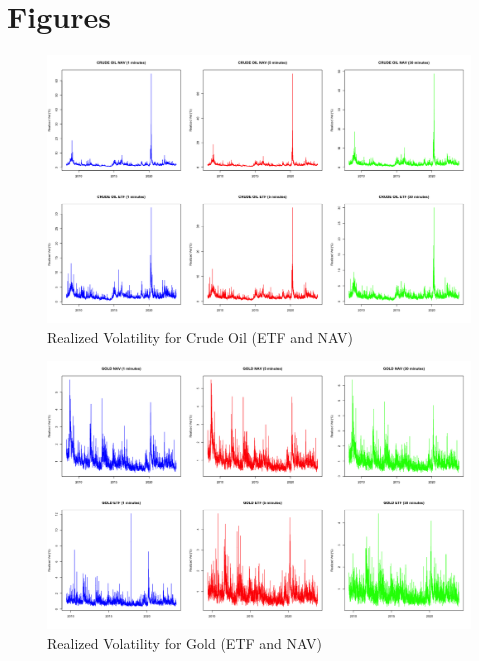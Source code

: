 
\section{Figures}


\begin{landscape}
\begin{figure}[t]
\includegraphics[width=16cm]{USO.png}
\centering
\caption{Realized Volatility for Crude Oil (ETF and NAV)}
\label{fig:rv_uso}
\end{figure}
\end{landscape}

\begin{landscape}
\begin{figure}[t]
\includegraphics[width=16cm]{GLD.png}
\centering
\caption{Realized Volatility for Gold (ETF and NAV)}
\label{fig:rv_gld}
\end{figure}
\end{landscape}

